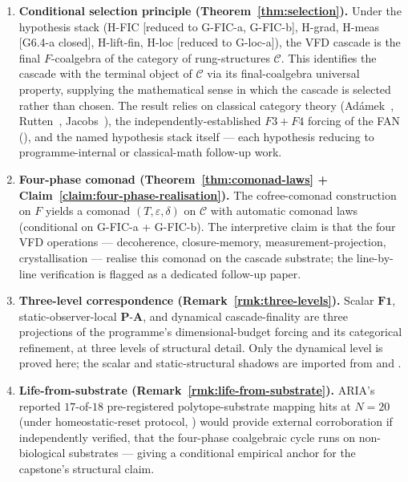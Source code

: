 \documentclass[11pt, a4paper]{amsart}
\theoremstyle{definition}
\newcommand{\catC}{\mathcal{C}}
\begin{document}
\begin{enumerate}
\item \textbf{Conditional selection principle
  (Theorem~\ref{thm:selection}).} Under the hypothesis stack
  (H-FIC [reduced to G-FIC-a, G-FIC-b], H-grad, H-meas
[G6.4-a closed], H-lift-fin, H-loc [reduced to G-loc-a]),
the VFD cascade is
  the final $F$-coalgebra of the category of rung-structures
  $\catC$. This identifies the cascade with the terminal
  object of $\catC$ via its final-coalgebra universal property,
  supplying the mathematical sense in which the cascade is
  selected rather than chosen. The result relies on classical
  category theory (Ad\'amek~\cite{Adamek1974},
  Rutten~\cite{Rutten2000}, Jacobs~\cite{Jacobs2017}), the
  independently-established $F3+F4$ forcing of the FAN
  (\cite{CascadeCompletenessAudit}), and the named hypothesis
  stack itself — each hypothesis reducing to programme-internal
  or classical-math follow-up work.
\item \textbf{Four-phase comonad
  (Theorem~\ref{thm:comonad-laws} + Claim~\ref{claim:four-phase-realisation}).}
  The cofree-comonad construction on $F$ yields a comonad
  $(T, \varepsilon, \delta)$ on $\catC$ with automatic comonad
  laws (conditional on G-FIC-a + G-FIC-b). The interpretive claim is that
  the four VFD operations — decoherence, closure-memory,
  measurement-projection, crystallisation — realise this
  comonad on the cascade substrate; the line-by-line
  verification is flagged as a dedicated follow-up paper.
\item \textbf{Three-level correspondence
  (Remark~\ref{rmk:three-levels}).} Scalar $\mathbf{F1}$,
  static-observer-local $\mathbf{P\text{-}A}$, and dynamical
  cascade-finality are three projections of the programme's
  dimensional-budget forcing and its categorical refinement,
  at three levels of structural detail. Only the dynamical
  level is proved here; the scalar and static-structural
  shadows are imported from
  \cite{CascadeCompletenessAudit} and
  \cite{CascadeAccessPrinciple}.
\item \textbf{Life-from-substrate
  (Remark~\ref{rmk:life-from-substrate}).} ARIA's reported
  $17$-of-$18$ pre-registered polytope-substrate mapping hits
  at $N{=}20$ (under homeostatic-reset protocol,
  \cite{AriaBrainMapping}) would provide external corroboration
  if independently verified, that the four-phase coalgebraic
  cycle runs on non-biological substrates — giving a
  conditional empirical anchor for the capstone's structural
  claim.
\end{enumerate}
\end{document}

